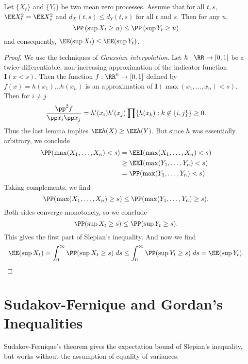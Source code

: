\begin{theorem}
    Let $\{ X_t \}$ and $\{ Y_t \}$ be two mean zero processes. Assume that for all $t,s$, $\EE X_t^2 = \EE X_s^2$ and $d_X(t,s) \leq d_Y(t,s)$ for all $t$ and $s$. Then for any $u$,
    \[ \PP \left( \sup X_t \geq u \right) \leq \PP \left( \sup Y_t \geq u \right) \]
    and consequently, $\EE(\sup X_t) \leq \EE(\sup Y_t)$.
\end{theorem}
\begin{proof}
    We use the techniques of \emph{Gaussian interpolation}. Let $h: \RR \to [0,1]$ be a twice-differentiable, non-increasing approximation of the indicator function $\mathbf{I}(x < s)$. Then the function $f: \RR^n \to [0,1]$ defined by $f(x) = h(x_1) \dots h(x_n)$ is an approximation of $\mathbf{I}(\max(x_1, \dots, x_n) < s)$. Then for $i \neq j$
    \[ \frac{\pp^2 f}{\pp x_i \pp x_j} = h'(x_i) h'(x_j) \prod \{ h(x_k) : k \not \in \{ i, j \} \} \geq 0. \]
    Thus the last lemma implies $\EE h(X) \geq \EE h(Y)$. But since $h$ was essentially arbitrary, we conclude
    \begin{align*}
        \PP(\max(X_1, \dots, X_n) < s) &= \EE \mathbf{I}(\max(X_1, \dots, X_n) < s)\\
        &\geq \EE \mathbf{I}(\max(Y_1, \dots, Y_n) < s)\\
        &= \PP(\max(Y_1, \dots, Y_n) < s).
    \end{align*}
    Taking complements, we find
    \[ \PP(\max(X_1, \dots, X_n) \geq s) \leq \PP(\max(Y_1, \dots, Y_n) \geq s). \]
    Both sides converge monotonely, so we conclude
    \[ \PP(\sup X_t \geq s) \leq \PP(\sup Y_t \geq s). \]
    This gives the first part of Slepian's inequality. And now we find
    \[ \EE(\sup X_t) = \int_0^\infty \PP(\sup X_t \geq s)\; ds \leq \int_0^\infty \PP(\sup Y_t \geq s)\; ds = \EE(\sup Y_t). \qedhere \]
\end{proof}








\section{Sudakov-Fernique and Gordan's Inequalities}

Sudakov-Fernique's theorem gives the expectation bound of Slepian's inequality, but works without the assumption of equality of variances.

